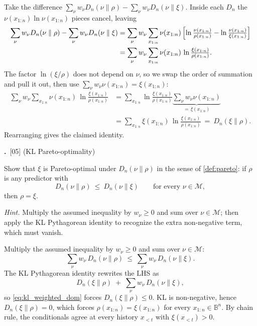 \documentclass[fontsize=11pt, parskip=half]{scrartcl}
\theoremstyle{definition}
\newenvironment{solution}{%
    \begin{tcolorbox}[colback=black!5!white, colframe=black!50!white,
      title={\textbf{Solution}}, fonttitle=\normalfont, breakable]
  }{\end{tcolorbox}}
\newenvironment{solution}{\expandafter\comment}{\expandafter\endcomment}
\newcommand{\mysubsection}[2]{\par\medskip\noindent\refstepcounter{subsection}\textbf{\thesubsection.}~#2\par\smallskip}
\newcommand{\Mc}{\mathcal{M}}
\begin{document}
\begin{solution}
Take the difference $\sum_\nu w_\nu D_n(\nu \parallel \rho) - \sum_\nu w_\nu D_n(\nu \parallel \xi)$.
Inside each $D_n$ the $\nu(x_{1:n}) \ln \nu(x_{1:n})$ pieces cancel, leaving
\begin{align*}
\sum_\nu w_\nu D_n(\nu \parallel \rho) - \sum_\nu w_\nu D_n(\nu \parallel \xi)
&= \sum_\nu w_\nu \sum_{x_{1:n}}
   \nu(x_{1:n})\,\Bigl[\ln\tfrac{\nu(x_{1:n})}{\rho(x_{1:n})}
                  - \ln\tfrac{\nu(x_{1:n})}{\xi(x_{1:n})}\Bigr] \\
&= \sum_\nu w_\nu \sum_{x_{1:n}}
   \nu(x_{1:n})\,\ln \tfrac{\xi(x_{1:n})}{\rho(x_{1:n})}.
\end{align*}
The factor $\ln(\xi/\rho)$ does not depend on $\nu$, so we swap the order of
summation and pull it out, then use $\sum_\nu w_\nu \nu(x_{1:n}) = \xi(x_{1:n})$:
\begin{align*}
\sum_\nu w_\nu \sum_{x_{1:n}}
   \nu(x_{1:n})\,\ln \tfrac{\xi(x_{1:n})}{\rho(x_{1:n})}
&= \sum_{x_{1:n}} \ln \tfrac{\xi(x_{1:n})}{\rho(x_{1:n})}
   \underbrace{\sum_\nu w_\nu \nu(x_{1:n})}_{=\, \xi(x_{1:n})} \\
&= \sum_{x_{1:n}} \xi(x_{1:n}) \,\ln \tfrac{\xi(x_{1:n})}{\rho(x_{1:n})}
~=~ D_n(\xi \parallel \rho).
\end{align*}
Rearranging gives the claimed identity. \qedhere
\end{solution}

\mysubsection{2}{[05] (KL Pareto-optimality)\label{prob:kl_pareto}}

Show that $\xi$ is Pareto-optimal under $D_n(\nu \parallel \rho)$ in the sense of \cref{def:pareto}: if $\rho$ is any predictor with
\[
  D_n(\nu \parallel \rho) ~\leq~ D_n(\nu \parallel \xi) \qquad \text{for every } \nu \in \Mc,
\]
then $\rho = \xi$.

\textit{Hint.} Multiply the assumed inequality by $w_\nu \geq 0$ and sum over
$\nu \in \Mc$; then apply the KL Pythagorean identity to recognize the extra
non-negative term, which must vanish.

\begin{solution}
Multiply the assumed inequality by $w_\nu \geq 0$ and sum over $\nu \in \Mc$:
\begin{equation}\label{eq:kl_weighted_dom}
  \sum_\nu w_\nu\, D_n(\nu \parallel \rho) ~\leq~ \sum_\nu w_\nu\, D_n(\nu \parallel \xi).
\end{equation}
The KL Pythagorean identity rewrites the LHS as
\[
  D_n(\xi \parallel \rho) \;+\; \sum_\nu w_\nu\, D_n(\nu \parallel \xi),
\]
so \cref{eq:kl_weighted_dom} forces $D_n(\xi \parallel \rho) \leq 0$. KL is non-negative, hence $D_n(\xi \parallel \rho) = 0$, which forces $\rho(x_{1:n}) = \xi(x_{1:n})$ for every $x_{1:n} \in \mathbb{B}^n$. By chain rule, the conditionals agree at every history $x_{<t}$ with $\xi(x_{<t}) > 0$. \qedhere
\end{solution}
\end{document}

